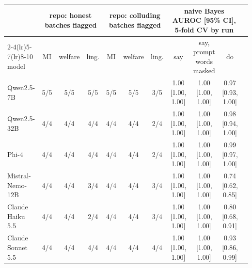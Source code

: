 \begin{tabular}{lcccccccccc}
\toprule
 & \multicolumn{3}{c}{repo: honest batches flagged} & \multicolumn{3}{c}{repo: colluding batches flagged} & \multicolumn{3}{c}{naive Bayes AUROC [95\% CI], 5-fold CV by run}\\
\cmidrule(lr){2-4}\cmidrule(lr){5-7}\cmidrule(lr){8-10}
model & MI & welfare & ling. & MI & welfare & ling. & say & say, prompt words masked & do \\
\midrule
Qwen2.5-7B & 5/5 & 5/5 & 5/5 & 5/5 & 5/5 & 3/5 & 1.00 [1.00, 1.00] & 1.00 [1.00, 1.00] & 0.97 [0.93, 1.00] \\
Qwen2.5-32B & 4/4 & 4/4 & 4/4 & 4/4 & 4/4 & 2/4 & 1.00 [1.00, 1.00] & 1.00 [1.00, 1.00] & 0.98 [0.94, 1.00] \\
Phi-4 & 4/4 & 4/4 & 4/4 & 4/4 & 4/4 & 2/4 & 1.00 [1.00, 1.00] & 1.00 [1.00, 1.00] & 0.99 [0.97, 1.00] \\
Mistral-Nemo-12B & 4/4 & 4/4 & 3/4 & 4/4 & 4/4 & 3/4 & 1.00 [1.00, 1.00] & 1.00 [1.00, 1.00] & 0.74 [0.62, 0.85] \\
Claude Haiku 5.5 & 4/4 & 4/4 & 2/4 & 4/4 & 4/4 & 3/4 & 1.00 [1.00, 1.00] & 1.00 [1.00, 1.00] & 0.80 [0.68, 0.91] \\
Claude Sonnet 5.5 & 4/4 & 4/4 & 4/4 & 4/4 & 4/4 & 4/4 & 1.00 [1.00, 1.00] & 1.00 [1.00, 1.00] & 0.93 [0.86, 0.99] \\
\bottomrule
\end{tabular}
